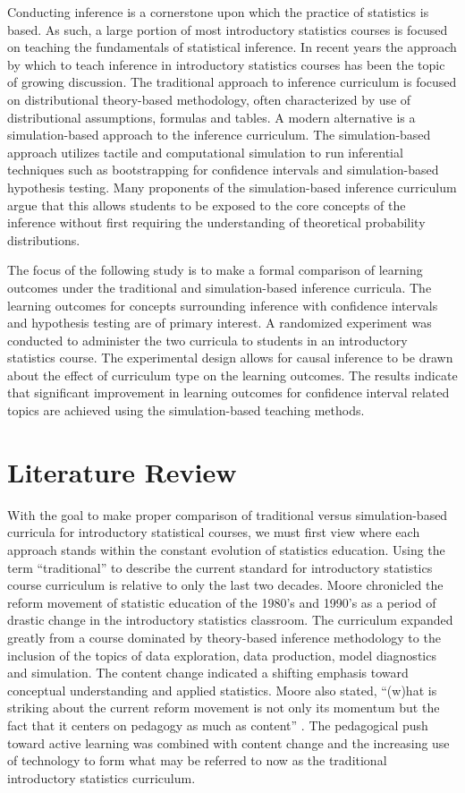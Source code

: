 Conducting inference is a cornerstone upon which the practice of statistics is based. As such, a large portion of most introductory statistics courses is focused on teaching the fundamentals of statistical inference. In recent years the approach by which to teach inference in introductory statistics courses has been the topic of growing discussion.  The traditional approach to inference curriculum is focused on distributional theory-based methodology, often characterized by use of distributional assumptions, formulas and tables. A modern alternative is a simulation-based approach to the inference curriculum. The simulation-based approach utilizes tactile and computational simulation to run inferential techniques such as bootstrapping for confidence intervals and simulation-based hypothesis testing. Many proponents of the simulation-based inference curriculum argue that this allows students to be exposed to the core concepts of the inference without first requiring the understanding of theoretical probability distributions. 

The focus of the following study is to make a formal comparison of learning outcomes under the traditional and simulation-based inference curricula.  The learning outcomes for concepts surrounding inference with confidence intervals and hypothesis testing are of primary interest.  A randomized experiment was conducted to administer the two curricula to students in an introductory statistics course. The experimental design allows for causal inference to be drawn about the effect of curriculum type on the learning outcomes. The results indicate that significant improvement in learning outcomes for confidence interval related topics are achieved using the simulation-based teaching methods.
\section{Literature Review}
\label{litreview}

With the goal to make proper comparison of traditional versus simulation-based curricula for introductory statistical courses, we must first view where each approach stands within the constant evolution of statistics education. Using the term ``traditional'' to describe the current standard for introductory statistics course curriculum is relative to only the last two decades. Moore chronicled the reform movement of statistic education of the 1980's and 1990's as a period of drastic change in the introductory statistics classroom.  The curriculum expanded greatly from a course dominated by theory-based inference methodology to the inclusion of the topics of data exploration, data production, model diagnostics and simulation.  The content change indicated a shifting emphasis toward conceptual understanding and applied statistics.  Moore also stated, ``(w)hat is striking about the current reform movement is not only its momentum but the fact that it centers on pedagogy as much as content'' \citep{Moore1997}. The pedagogical push toward active learning was combined with content change and the increasing use of technology to form what may be referred to now as the traditional introductory statistics curriculum. 

